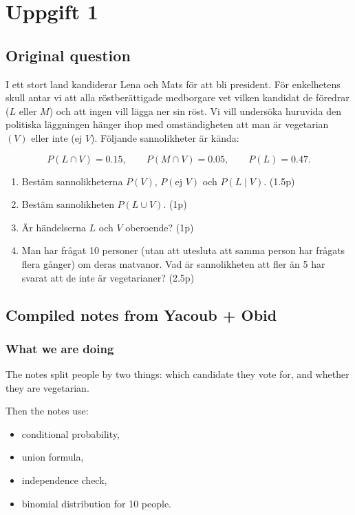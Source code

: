 \documentclass[10pt]{article}
\begin{document}
\section*{Uppgift 1}

\subsection*{Original question}
I ett stort land kandiderar Lena och Mats för att
bli president.
För enkelhetens skull antar vi att alla
röstberättigade medborgare vet vilken kandidat de
föredrar (\(L\) eller \(M\)) och att ingen vill lägga
ner sin röst.
Vi vill undersöka huruvida den politiska läggningen
hänger ihop med omständigheten att man är vegetarian
\((V)\) eller inte (ej \(V\)).
Följande sannolikheter är kända:

\[
P(L\cap V)=0.15,
\qquad
P(M\cap V)=0.05,
\qquad
P(L)=0.47.
\]

\begin{enumerate}[label=\alph*)]
\item Bestäm sannolikheterna
\(P(V)\), \(P(\text{ej }V)\) och \(P(L\mid V)\).
\hfill (1.5p)

\item Bestäm sannolikheten \(P(L\cup V)\).
\hfill (1p)

\item Är händelserna \(L\) och \(V\) oberoende?
\hfill (1p)

\item Man har frågat 10 personer (utan att utesluta
att samma person har frågats flera gånger) om deras
matvanor.
Vad är sannolikheten att fler än 5 har svarat att de
inte är vegetarianer?
\hfill (2.5p)
\end{enumerate}

\subsection*{Compiled notes from Yacoub + Obid}

\subsubsection*{What we are doing}
The notes split people by two things:
which candidate they vote for,
and whether they are vegetarian.

Then the notes use:
\begin{itemize}
\item conditional probability,
\item union formula,
\item independence check,
\item binomial distribution for 10 people.
\end{itemize}
\end{document}

